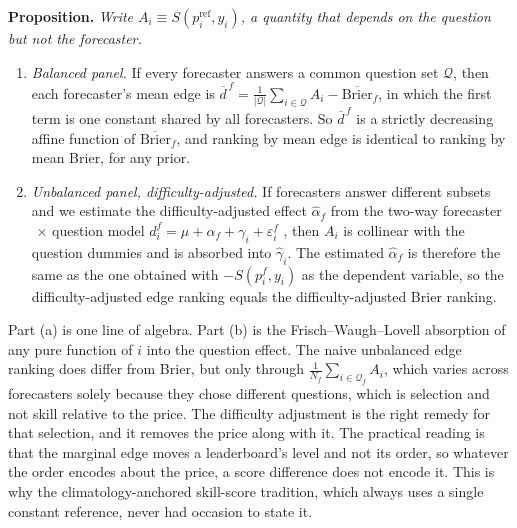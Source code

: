 \documentclass[11pt]{article}
\begin{document}
\textbf{Proposition.} \emph{Write $A_i \equiv S(p^{\mathrm{ref}}_i,y_i)$, a quantity that depends on the question but not the forecaster.}
\begin{enumerate}[leftmargin=1.6em,itemsep=2pt,label=(\alph*)]
\item \emph{Balanced panel.} If every forecaster answers a common question set $\mathcal Q$, then each forecaster's mean edge is $\overline d^{\,f} = \frac1{|\mathcal Q|}\sum_{i\in\mathcal Q} A_i - \overline{\mathrm{Brier}}_f$, in which the first term is one constant shared by all forecasters. So $\overline d^{\,f}$ is a strictly decreasing affine function of $\overline{\mathrm{Brier}}_f$, and ranking by mean edge is identical to ranking by mean Brier, for any prior.
\item \emph{Unbalanced panel, difficulty-adjusted.} If forecasters answer different subsets and we estimate the difficulty-adjusted effect $\hat\alpha_f$ from the two-way forecaster$\,\times\,$question model $d_i^f = \mu + \alpha_f + \gamma_i + \varepsilon_i^f$ \citep{abowd1999}, then $A_i$ is collinear with the question dummies and is absorbed into $\hat\gamma_i$. The estimated $\hat\alpha_f$ is therefore the same as the one obtained with $-S(p^f_i,y_i)$ as the dependent variable, so the difficulty-adjusted edge ranking equals the difficulty-adjusted Brier ranking.
\end{enumerate}
Part (a) is one line of algebra. Part (b) is the Frisch--Waugh--Lovell absorption \citep{frisch1933,lovell1963} of any pure function of $i$ into the question effect. The naive unbalanced edge ranking does differ from Brier, but only through $\frac1{N_f}\sum_{i\in\mathcal Q_f} A_i$, which varies across forecasters solely because they chose different questions, which is selection and not skill relative to the price. The difficulty adjustment is the right remedy for that selection, and it removes the price along with it. The practical reading is that the marginal edge moves a leaderboard's level and not its order, so whatever the order encodes about the price, a score difference does not encode it. This is why the climatology-anchored skill-score tradition, which always uses a single constant reference, never had occasion to state it.
\end{document}
